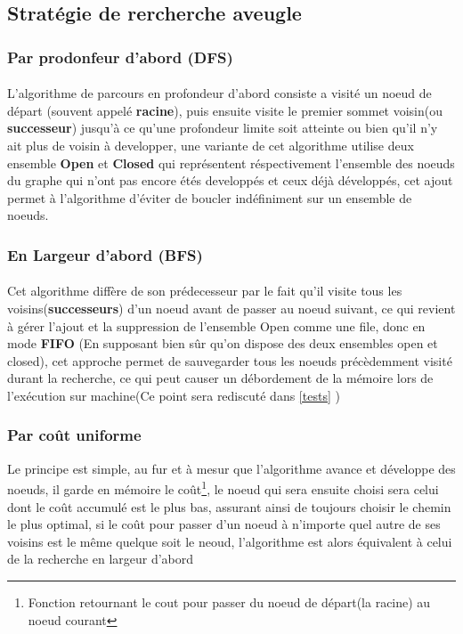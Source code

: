 \documentclass[12pt]{report}
\begin{document}
\subsection
{Stratégie de rercherche aveugle}
\subsubsection{Par prodonfeur d'abord (DFS)}
\paragraph{}
L'algorithme de parcours en profondeur d'abord consiste a visité un noeud de départ (souvent appelé \textbf{racine}), puis ensuite visite le premier sommet voisin(ou \textbf{successeur}) jusqu'à ce qu'une profondeur limite soit atteinte ou bien qu'il n'y ait plus de voisin à developper, une variante de cet algorithme utilise deux ensemble \textbf{Open} et \textbf{Closed} qui représentent réspectivement l'ensemble des noeuds du graphe qui n'ont pas encore étés developpés et ceux déjà développés, cet ajout permet à l'algorithme d'éviter de boucler indéfiniment sur un ensemble de noeuds.
\subsubsection{En Largeur d'abord (BFS)}
\paragraph{}
Cet algorithme diffère de son prédecesseur par le fait qu'il visite tous les voisins(\textbf{successeurs}) d'un noeud avant de passer au noeud suivant, ce qui revient à gérer l'ajout et la suppression de l'ensemble Open comme une file, donc en mode \textbf{FIFO} (En supposant bien sûr qu'on dispose des deux ensembles open et closed), cet approche permet de sauvegarder tous les noeuds précèdemment visité durant la recherche, ce qui peut causer un débordement de la mémoire lors de l'exécution sur machine(Ce point sera rediscuté dans \ref{tests} )

\subsubsection{Par coût uniforme}
Le principe est simple, au fur et à mesur que l'algorithme avance et développe des noeuds, il garde en mémoire le coût\footnote[1]{Fonction retournant le cout pour passer du noeud de départ(la racine) au noeud courant}, le noeud qui sera ensuite choisi sera celui dont le coût accumulé est le plus bas, assurant ainsi de toujours choisir le chemin le plus optimal, si le coût pour passer d'un noeud à n'importe quel autre de ses voisins est le même quelque soit le neoud, l'algorithme est alors équivalent à celui de la recherche en largeur d'abord
\end{document}
